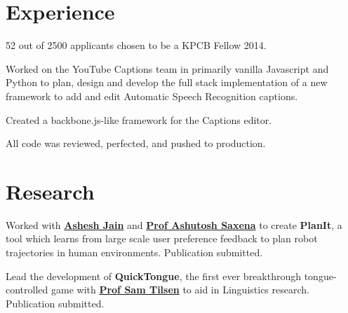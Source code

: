 \documentclass[]{deedy-resume-openfont}
\begin{document}
\begin{minipage}[t]{0.66\textwidth} 


\section{ \textcolor{gray}{} Experience}

\vspace{\topsep} %
\begin{tightemize}\item 52 out of 2500 applicants chosen to be a KPCB Fellow 2014.
\end{tightemize}
\sectionsep

\begin{tightemize}
\item Worked on the YouTube Captions team in primarily vanilla Javascript and Python to plan, design and develop the full stack implementation of a new framework to add and edit Automatic Speech Recognition captions.\item Created a backbone.js-like framework for the Captions editor.\item All code was reviewed, perfected, and pushed to production.\end{tightemize}
\sectionsep

\section{ \textcolor{gray}{} Research}
Worked with \textbf{\href{http://www.cs.cornell.edu/~ashesh/}{Ashesh Jain}} and \textbf{\href{http://www.cs.cornell.edu/~asaxena/}{Prof Ashutosh Saxena}} to create \textbf{PlanIt}, a tool which  learns from large scale user preference feedback to plan robot trajectories in human environments.  Publication submitted.
\sectionsep

Lead the development of \textbf{QuickTongue}, the first ever breakthrough tongue-controlled game with \textbf{\href{http://conf.ling.cornell.edu/~tilsen/}{Prof Sam Tilsen}} to aid in Linguistics research. Publication submitted.
\sectionsep

\end{minipage}
\end{document}
